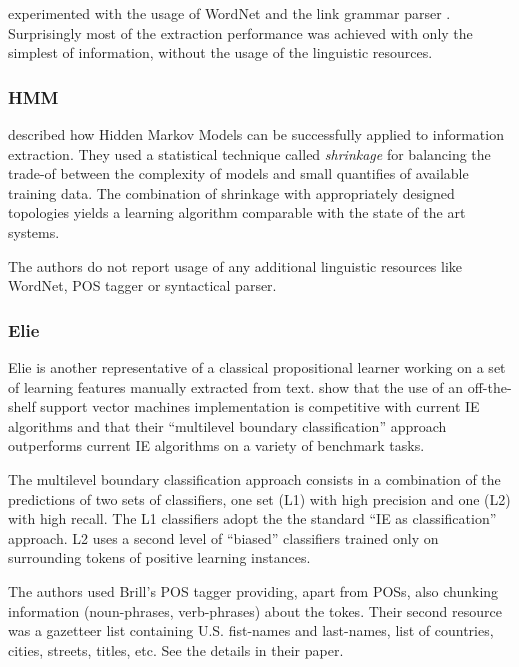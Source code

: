 \cite{Freitag:1999_phd} experimented with the usage of WordNet \citep{Miller:1995:WLD:219717.219748} and the link grammar parser \citep{linkparser}. Surprisingly most of the extraction performance was achieved with only the simplest of information, without the usage of the linguistic resources.

\subsubsection{HMM}

\cite{Freitag1999InformationExtraction} described how Hidden Markov Models can be successfully applied to information extraction. They used a statistical technique called \emph{shrinkage} for balancing the trade-of between the complexity of models and small quantifies of available training data. The combination of shrinkage with appropriately designed topologies yields a learning algorithm comparable with the state of the art systems.

The authors do not report usage of any additional linguistic resources like WordNet, POS tagger or syntactical parser.

\subsubsection{Elie}

Elie \citep{DBLP:conf/ecml/FinnK04} is another representative of a classical propositional learner working on a set of learning features manually extracted from text. \cite{DBLP:conf/ecml/FinnK04} show that the use of an off-the-shelf support vector machines implementation is competitive with current IE algorithms and that their ``multilevel boundary classification'' approach outperforms current IE algorithms on a variety of benchmark tasks.

The multilevel boundary classification approach consists in a combination of the predictions of two sets of classifiers, one set (L1) with high precision and one (L2) with high recall. The L1 classifiers adopt the the standard ``IE as classification'' approach. L2 uses a second level of ``biased'' classifiers trained only on surrounding tokens of positive learning instances.

The authors used Brill's POS tagger \citep{Brill:1994:ATP:199288.199378} providing, apart from POSs, also chunking information (noun-phrases, verb-phrases) about the tokes. Their second resource was a gazetteer list containing U.S. fist-names and last-names, list of countries, cities, streets, titles, etc. See the details in their paper.

